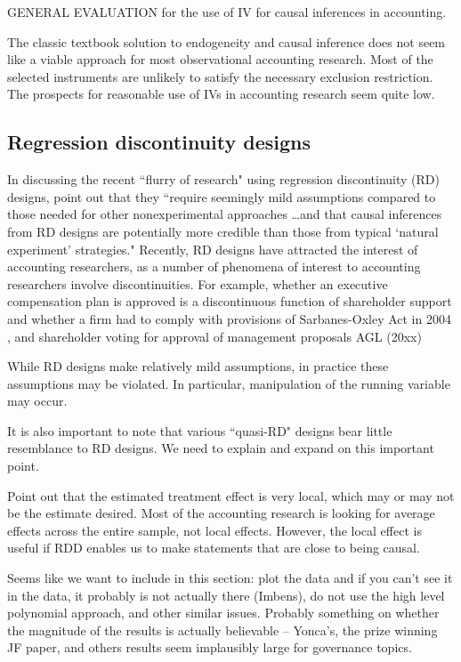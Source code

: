 \documentclass[11pt]{amsart}
\begin{document}
GENERAL EVALUATION for the use of IV for causal inferences in accounting.  

The classic textbook solution to endogeneity and causal inference does not seem like a viable approach for most observational accounting research.  Most of the selected instruments are unlikely to satisfy the necessary exclusion restriction.  The prospects for reasonable use of IVs in accounting research seem quite low.

\subsection{Regression discontinuity designs} 

In discussing the recent ``flurry of research" using regression discontinuity (RD) designs, \citet[p.282]{Lee:2010hya} point out that they ``require seemingly mild assumptions compared to those needed for other nonexperimental approaches \dots and that causal inferences from RD designs are potentially more credible than those from typical `natural experiment' strategies." 
Recently, RD designs have attracted the interest of accounting researchers, as a number of phenomena of interest to accounting researchers involve discontinuities. For example, whether an executive compensation plan is approved is a discontinuous function of shareholder support \citet{Armstrong:2013io} and whether a firm had to comply with provisions of Sarbanes-Oxley Act in 2004 \citep{Iliev:2010ic}, and shareholder voting for approval of management proposals AGL (20xx)

While RD designs make relatively mild assumptions, in practice these assumptions may be violated. In particular, manipulation of the running variable may occur.

It is also important to note that various ``quasi-RD" designs bear little resemblance to RD designs. We need to explain and expand on this important point.

Point out that the estimated treatment effect is very local, which may or may not be the estimate desired.  Most of the accounting research is looking for average effects across the entire sample, not local effects.  However, the local effect is useful if RDD enables us to make statements that are close to being causal.

Seems like we want to include in this section:  plot the data and if you can't see it in the data, it probably is not actually there (Imbens), do not use the high level polynomial approach, and other similar issues.  Probably something on whether the magnitude of the results is actually believable -- Yonca's, the prize winning JF paper, and others results seem implausibly large for governance topics.
\end{document}
